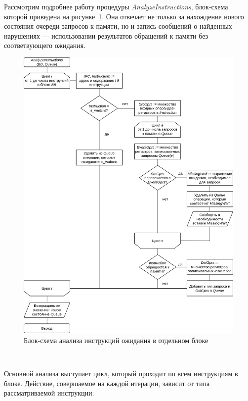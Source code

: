\documentclass[a4paper,14pt]{extarticle}
\begin{document}
{Рассмотрим подробнее работу процедуры \textit{AnalyzeInstructions}, блок-схема которой приведена
на рисунке~\ref{fig:diagram-waitcnt-analyze}. Она отвечает не только за нахождение нового состояния
очереди запросов к памяти, но и запись сообщений о найденных нарушениях — использовании результатов
обращений к памяти без соответвующего ожидания.

\begin{figure}[H]
\centering
\includegraphics[width=\textwidth]{diagrams/alg-waitcnt-analyze}
\caption{Блок-схема анализа инструкций ожидания в отдельном блоке}
\label{fig:diagram-waitcnt-analyze}
\end{figure}\ %

Основной анализа выступает цикл, который проходит по всем инструкциям в блоке. Действие, совершаемое
на каждой итерации, зависит от типа рассматриваемой инструкции:

}
\end{document}
